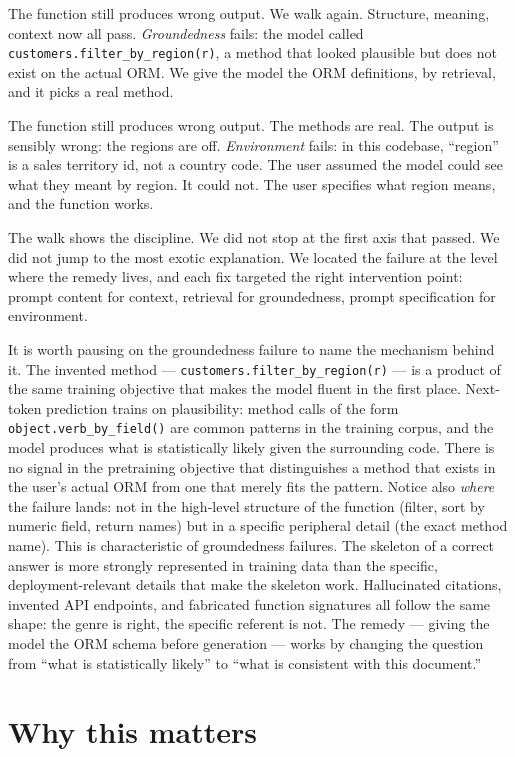 \documentclass[11pt,a4paper]{article}
\begin{document}
The function still produces wrong output. We walk again. Structure,
meaning, context now all pass. \emph{Groundedness} fails: the model
called \texttt{customers.filter\_by\_region(r)}, a method that
looked plausible but does not exist on the actual ORM. We give the
model the ORM definitions, by retrieval, and it picks a real
method.

The function still produces wrong output. The methods are real.
The output is sensibly wrong: the regions are off.
\emph{Environment} fails: in this codebase, ``region'' is a sales
territory id, not a country code. The user assumed the model could
see what they meant by region. It could not. The user specifies
what region means, and the function works.

The walk shows the discipline. We did not stop at the first axis
that passed. We did not jump to the most exotic explanation. We
located the failure at the level where the remedy lives, and each
fix targeted the right intervention point: prompt content for
context, retrieval for groundedness, prompt specification for
environment.

It is worth pausing on the groundedness failure to name the
mechanism behind it. The invented method ---
\texttt{customers.filter\_by\_region(r)} --- is a product of the
same training objective that makes the model fluent in the first
place. Next-token prediction trains on plausibility: method calls
of the form \texttt{object.verb\_by\_field()} are common patterns
in the training corpus, and the model produces what is statistically
likely given the surrounding code. There is no signal in the
pretraining objective that distinguishes a method that exists in
the user's actual ORM from one that merely fits the pattern.
Notice also \emph{where} the failure lands: not in the high-level
structure of the function (filter, sort by numeric field, return
names) but in a specific peripheral detail (the exact method
name). This is characteristic of groundedness failures. The
skeleton of a correct answer is more strongly represented in
training data than the specific, deployment-relevant details that
make the skeleton work. Hallucinated citations, invented API
endpoints, and fabricated function signatures all follow the
same shape: the genre is right, the specific referent is not.
The remedy --- giving the model the ORM schema before generation
--- works by changing the question from ``what is statistically
likely'' to ``what is consistent with this document.''

\section*{Why this matters}
\end{document}
